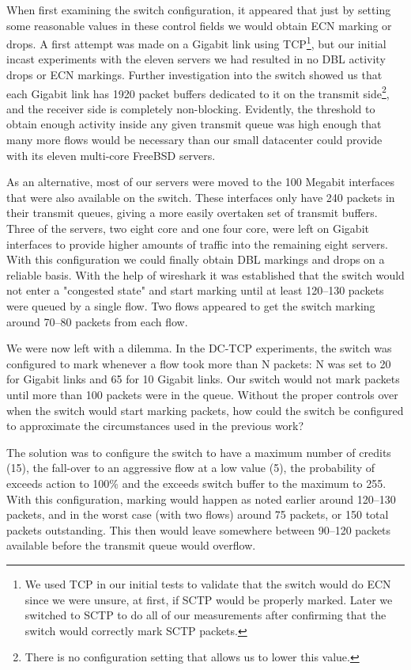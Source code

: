 \documentclass[12pt]{article}
\begin{document}
 When first examining the switch configuration, it appeared that just by setting some reasonable values in these
 control fields we would obtain ECN marking or drops. A first attempt was made on a Gigabit
 link using TCP\footnote{We used TCP in our initial tests to validate that the switch would do ECN since
 we were unsure, at first, if SCTP would be properly marked. Later we switched to SCTP to do all of our measurements
 after confirming that the switch would correctly mark SCTP packets.},
 but our initial incast experiments with the eleven servers we had resulted in no DBL  
 activity drops or ECN markings. Further investigation into the switch showed us that each Gigabit link has 1920 packet
 buffers dedicated to it on the transmit side\footnote{There is no configuration setting that allows us
 to lower this value.}, and the receiver side is completely non-blocking. Evidently, the
 threshold to obtain enough activity inside any given transmit queue was high enough that many more
 flows would be necessary than our small datacenter could provide with its eleven multi-core FreeBSD servers. 
 
 As an alternative, most of our servers were moved to the 100 Megabit interfaces that were also available
 on the switch. These interfaces only have 240 packets in their transmit queues, giving a more easily
 overtaken set of transmit buffers. Three of the servers,
 two eight core and one four core, were left on Gigabit interfaces to provide higher amounts of traffic
 into the remaining eight servers. With this configuration we could finally obtain DBL markings and drops
 on a reliable basis. With the help of wireshark\cite{wireshark} it was established that the switch would not
 enter a "congested state" and start marking until at least 120--130 packets were queued by a single
 flow. Two flows appeared to get the switch marking around 70--80 packets from each flow.
 
We were now left with a dilemma. In the DC-TCP experiments, the switch was configured to mark
 whenever a flow took more than N packets:  N was set to 20 for Gigabit links and 65 for
 10 Gigabit links. Our switch would not mark packets until more than
 100 packets were in the queue. Without the proper controls over when the switch would start marking packets,  how could the switch 
 be configured to approximate the circumstances used in the previous work?
 
 The solution was to configure the switch to have a maximum number
 of credits (15), the fall-over to an aggressive flow at a low value (5), the probability
 of exceeds action to 100\% and the exceeds switch buffer to the maximum to 255. With
 this configuration, marking would happen as noted earlier around 120--130 packets, and
 in the worst case (with two flows) around 75 packets, or 150 total packets outstanding. This then
 would leave somewhere between 90--120 packets available before the transmit queue would overflow.
 
\end{document}
